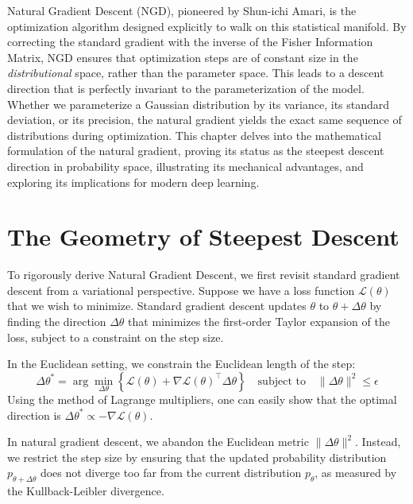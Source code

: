 Natural Gradient Descent (NGD), pioneered by Shun-ichi Amari, is the optimization algorithm designed explicitly to walk on this statistical manifold. By correcting the standard gradient with the inverse of the Fisher Information Matrix, NGD ensures that optimization steps are of constant size in the \textit{distributional} space, rather than the parameter space. This leads to a descent direction that is perfectly invariant to the parameterization of the model. Whether we parameterize a Gaussian distribution by its variance, its standard deviation, or its precision, the natural gradient yields the exact same sequence of distributions during optimization. This chapter delves into the mathematical formulation of the natural gradient, proving its status as the steepest descent direction in probability space, illustrating its mechanical advantages, and exploring its implications for modern deep learning.

\section{The Geometry of Steepest Descent}

To rigorously derive Natural Gradient Descent, we first revisit standard gradient descent from a variational perspective. Suppose we have a loss function $\mathcal{L}(\theta)$ that we wish to minimize. Standard gradient descent updates $\theta$ to $\theta + \Delta \theta$ by finding the direction $\Delta \theta$ that minimizes the first-order Taylor expansion of the loss, subject to a constraint on the step size.

In the Euclidean setting, we constrain the Euclidean length of the step:
\begin{equation}
    \Delta \theta^* = \arg\min_{\Delta \theta} \left\{ \mathcal{L}(\theta) + \nabla \mathcal{L}(\theta)^\top \Delta \theta \right\} \quad \text{subject to} \quad \|\Delta \theta\|^2 \leq \epsilon
\end{equation}
Using the method of Lagrange multipliers, one can easily show that the optimal direction is $\Delta \theta^* \propto -\nabla \mathcal{L}(\theta)$.

In natural gradient descent, we abandon the Euclidean metric $\|\Delta \theta\|^2$. Instead, we restrict the step size by ensuring that the updated probability distribution $p_{\theta+\Delta\theta}$ does not diverge too far from the current distribution $p_\theta$, as measured by the Kullback-Leibler divergence.

